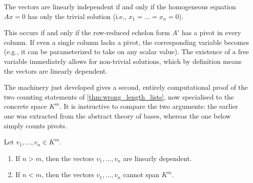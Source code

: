 \begin{answer}[To Question 3]
The vectors are linearly independent if and only if the homogeneous equation $Ax = 0$ has only the trivial solution (i.e., $x_1 = \dots = x_n = 0$). 

This occurs if and only if the row-reduced echelon form $A'$ has a pivot in every column. If even a single column lacks a pivot, the corresponding variable becomes  (e.g., it can be parameterized to take on any scalar value). The existence of a free variable immediately allows for non-trivial solutions, which by definition means the vectors are linearly dependent.
\end{answer}

The machinery just developed gives a second, entirely computational proof of the two counting statements of \cref{thm:wrong_length_lists}, now specialised to the concrete space $K^{m}$. It is instructive to compare the two arguments: the earlier one was extracted from the abstract theory of bases, whereas the one below simply counts pivots.

\begin{theorem}
\label{thm:coordinate_constraints}
Let $v_{1}, \dots, v_{n} \in K^{m}$.
\begin{enumerate}[label=\textbf{(\alph*)}]
    \item If $n > m$, then the vectors $v_{1}, \dots, v_{n}$ are linearly dependent.
    \item If $n < m$, then the vectors $v_{1}, \dots, v_{n}$ cannot span $K^{m}$.
\end{enumerate}
\end{theorem}

